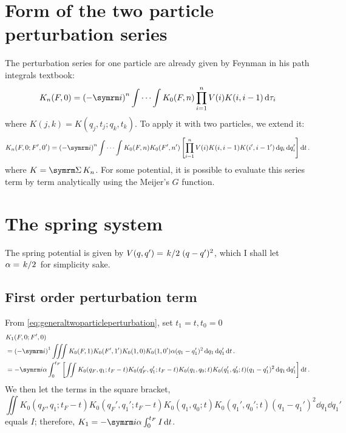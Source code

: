 \section{Form of the two particle perturbation series}

The perturbation series for one particle are already given by Feynman in his path integrals textbook:
\begin{equation}
    K_n(F, 0) = \left(-\im\right)^n\idotsint K_0(F, n)\prod_{i = 1}^n V(i)K(i, i - 1)\dd{\tau_i}
\end{equation}
where $K(j, k) = K(q_j, t_j; q_k, t_k)$. To apply it with two particles, we extend it:
\begin{equation}
    K_n(F, 0; F', 0') = \left(-\im\right)^n\idotsint K_0(F, n)K_0(F', n')\left[\prod_{i = 1}^nV(i)K(i, i - 1)K(i', i - 1')\dd{q_i}\dd{q_i'}\right]\dd{t}. \label{eq:generaltwoparticleperturbation}
\end{equation}
where $K = \ssum K_n$. For some potential, it is possible to evaluate this series term by term analytically using the Meijer's $G$ function.

\section{The spring system}

The spring potential is given by $V(q, q') = \flatfrac{k}{2}(q - q')^2$, which I shall let $\alpha = \flatfrac{k}{2}$ for simplicity sake.

\subsection{First order perturbation term}
\label{sec:spring_1storder}

From \cref{eq:generaltwoparticleperturbation}, set $t_1 = t, t_0 = 0$
\begin{align}
    &K_1(F, 0; F', 0) \nonumber \\
    &= \left(-\im\right)^1\iiint K_0(F, 1)K_0(F', 1')K_0(1, 0)K_0(1, 0')\alpha(q_1 - q_1')^2\dd{q_1}\dd{q_1'}\dd{t}. \\
    &= -\im\alpha\int_0^{t_F}\left[\iint K_0(q_F, q_1; t_F - t)K_0(q_F', q_1'; t_F - t)K_0(q_1, q_0; t)K_0(q_1', q_0'; t)(q_1 - q_1')^2\dd{q_1}\dd{q_1'}\right]\dd{t}. \nonumber
\end{align}
We then let the terms in the square bracket,
\begin{equation}
    \iint K_0(q_F, q_1; t_F - t)K_0(q_F', q_1'; t_F - t)K_0(q_1, q_0; t)K_0(q_1', q_0'; t)(q_1 - q_1')^2\dd{q_1}\dd{q_1'}
\end{equation}
equals $I$; therefore, $K_1 = -\im\alpha\int_0^{t_F} I\dd{t}$.

